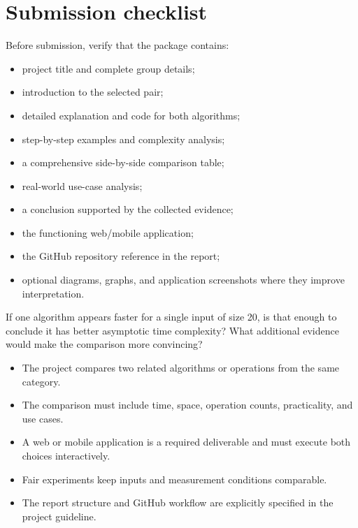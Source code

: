\section{Submission checklist}

\begin{verification}
Before submission, verify that the package contains:
\begin{itemize}
  \item project title and complete group details;
  \item introduction to the selected pair;
  \item detailed explanation and code for both algorithms;
  \item step-by-step examples and complexity analysis;
  \item a comprehensive side-by-side comparison table;
  \item real-world use-case analysis;
  \item a conclusion supported by the collected evidence;
  \item the functioning web/mobile application;
  \item the GitHub repository reference in the report;
  \item optional diagrams, graphs, and application screenshots where they improve interpretation.
\end{itemize}
\end{verification}

\begin{quickcheck}
If one algorithm appears faster for a single input of size 20, is that enough to conclude it has better asymptotic time complexity? What additional evidence would make the comparison more convincing?
\end{quickcheck}

\begin{chapterrecap}
\begin{itemize}
  \item The project compares two related algorithms or operations from the same category.
  \item The comparison must include time, space, operation counts, practicality, and use cases.
  \item A web or mobile application is a required deliverable and must execute both choices interactively.
  \item Fair experiments keep inputs and measurement conditions comparable.
  \item The report structure and GitHub workflow are explicitly specified in the project guideline.
\end{itemize}
\end{chapterrecap}

